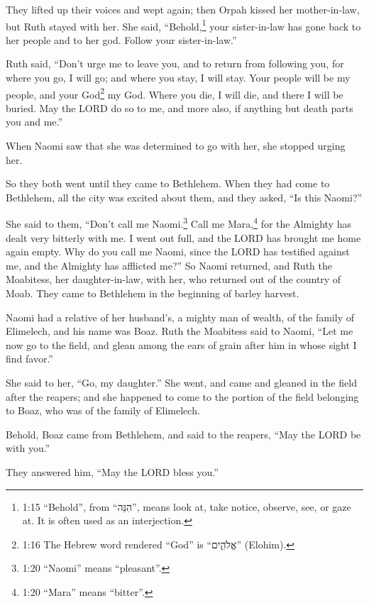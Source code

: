 \myverse{}They lifted up their voices and wept again; then Orpah kissed
her mother-in-law, but Ruth stayed with her.
\myverse{}She said, “Behold,\footnote{  1:15 “Behold”, from “הִנֵּה”, means look at, take notice, observe, see, or gaze at. It is
	often used as an interjection.} your sister-in-law has gone back to her people and to her god.
Follow your sister-in-law.”

\myverse{}Ruth said, “Don’t urge me to leave you, and to return from following
you, for where you go, I will go; and where you stay, I will stay. Your people will be my people, and
your God\footnote{  1:16 The Hebrew word rendered “God” is “אֱלֹהִ֑ים” (Elohim).} my God.
\myverse{}Where you die, I will die, and there I will be buried. May the LORD do so
to me, and more also, if anything but death parts you and me.”

\myverse{}When Naomi saw that she was determined to go with her, she stopped
urging her.

\myverse{}So they both went until they came to Bethlehem. When they had
come to Bethlehem, all the city was excited about them, and they asked, “Is this Naomi?”

\myverse{}She said to them, “Don’t call me Naomi.\footnote{  1:20 “Naomi” means “pleasant”.} Call me Mara,\footnote{  1:20 “Mara” means “bitter”.} for the Almighty has dealt very bitterly with me.
\myverse{}I went out full, and the LORD has brought me home again empty. Why do you
call me Naomi, since the LORD has testified against me, and the Almighty has afflicted me?”
\myverse{}So Naomi returned, and Ruth the Moabitess, her daughter-in-law, with her,
who returned out of the country of Moab. They came to Bethlehem in the beginning of barley harvest.


\mychapter{} \myverse*{}Naomi had a relative of her husband’s, a mighty man of wealth,
of the family of Elimelech, and his name was Boaz.
\myverse{}Ruth the Moabitess said to Naomi, “Let me now go to the field, and glean among
the ears of grain after him in whose sight I find favor.”

She said to her, “Go, my daughter.”
\myverse{}She went, and came and gleaned in the field after the reapers; and she happened
to come to the portion of the field belonging to Boaz, who was of the family of Elimelech.

\myverse{}Behold, Boaz came from Bethlehem, and said to the reapers, “May
the LORD be with you.”

They answered him, “May the LORD bless you.”

